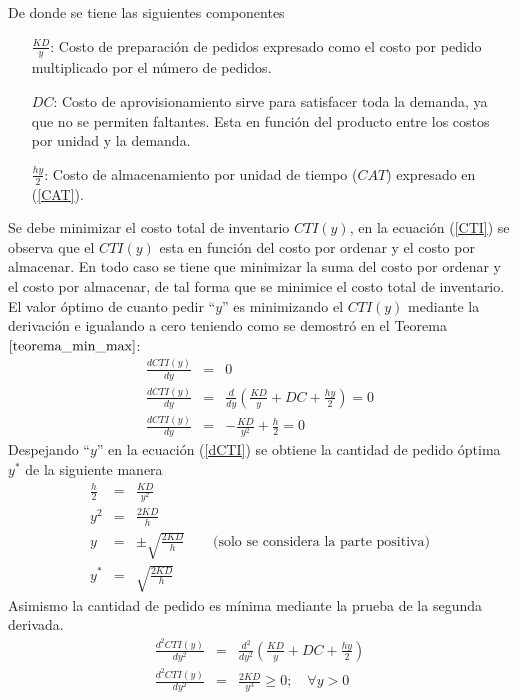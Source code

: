 De donde se tiene las siguientes componentes
\begin{itemize}
	\item[$\frac{KD}{y}$:] Costo de preparación de pedidos expresado como el costo por pedido multiplicado por el número de pedidos.
	\item[$DC$:] Costo de aprovisionamiento sirve para satisfacer toda la demanda, ya que no se permiten faltantes. Esta en función del producto entre los costos por unidad y la demanda.
	\item[$\frac{hy}{2}$:] Costo de almacenamiento por unidad de tiempo ($CAT$) expresado en (\ref{CAT}).
\end{itemize}	
Se debe minimizar el costo total de inventario $CTI(y)$, en la ecuación (\ref{CTI}) se observa que el $CTI(y)$ esta en función del costo por ordenar y el costo por almacenar.
En todo caso se tiene que minimizar la suma del costo por ordenar y el costo por almacenar, de tal forma que se minimice el costo total de inventario. El valor óptimo de cuanto pedir ``$y$'' es minimizando el $CTI(y)$ mediante la derivación e igualando a cero teniendo como se demostró en el Teorema $\ref{teorema_min_max}$:
\clearpage
\begin{eqnarray}
	\label{dCTI}
	\frac{dCTI(y)}{dy} &=& 0 \nonumber \\
	\frac{dCTI(y)}{dy} &=& \frac{d}{dy}\left(\frac{KD}{y} + DC + \frac{hy}{2} \right) = 0 \nonumber \\
	\frac{dCTI(y)}{dy} &=& - \frac{KD}{y^2} + \frac{h}{2} = 0
\end{eqnarray}
Despejando ``$y$'' en la ecuación (\ref{dCTI}) se obtiene la cantidad de pedido óptima $y^*$ de la siguiente manera
\begin{eqnarray}
	\label{yopt}
	\frac{h}{2} &=& \frac{KD}{y^2} \nonumber \\
	y^2 &=& \frac{2KD}{h} \nonumber \\
	y &=& \pm \sqrt{\frac{2KD}{h}} \qquad \text{(solo se considera la parte positiva)} \nonumber \\
	y^* &=& \sqrt{\frac{2KD}{h}}
\end{eqnarray}
Asimismo la cantidad de pedido es mínima mediante la prueba de la segunda derivada.
\begin{eqnarray}
	\label{minimo1}
	\frac{d^2 CTI(y)}{dy^2} &=& \frac{d^2}{dy^2} \left(\frac{KD}{y} + DC + \frac{hy}{2} \right) \nonumber \\
	\frac{d^2 CTI(y)}{dy^2} &=& \frac{2KD}{y^3} \geq 0; \quad \forall y > 0
\end{eqnarray}
